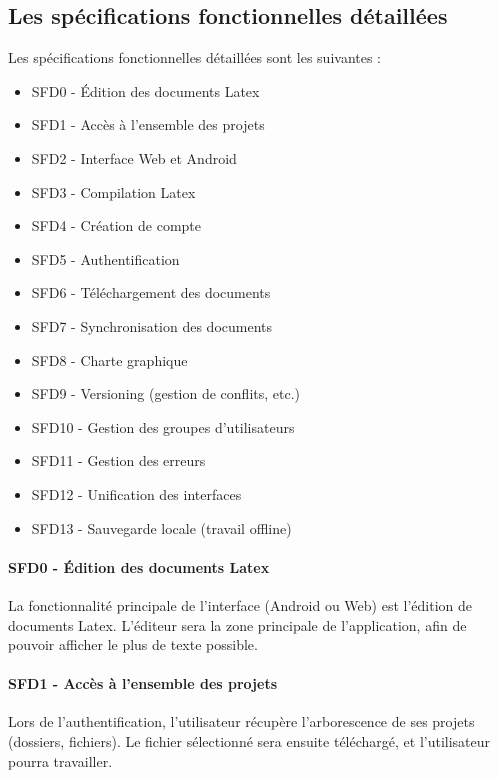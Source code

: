 \documentclass[a4paper,12pt]{article}
\begin{document}
\subsection{Les spécifications fonctionnelles détaillées}
 	
Les spécifications fonctionnelles détaillées sont les suivantes :\\

\begin{itemize}
 \item SFD0 - \'Edition des documents Latex
 \item SFD1 - Accès à l'ensemble des projets
 \item SFD2 - Interface Web et Android
 \item SFD3 - Compilation Latex
 \item SFD4 - Création de compte
 \item SFD5 - Authentification
 \item SFD6 - Téléchargement des documents
 \item SFD7 - Synchronisation des documents
 \item SFD8 - Charte graphique
 \item SFD9 - Versioning (gestion de conflits, etc.)
 \item SFD10 - Gestion des groupes d'utilisateurs
 \item SFD11 - Gestion des erreurs
 \item SFD12 - Unification des interfaces
 \item SFD13 - Sauvegarde locale (travail offline)
\end{itemize}

\paragraph{SFD0 - \'Edition des documents Latex\\}
La fonctionnalité principale de l'interface (Android ou Web) est l'édition de documents Latex. 
L'éditeur sera la zone principale de l'application, afin de pouvoir afficher le plus de texte 
possible.

\paragraph{SFD1 - Accès à l'ensemble des projets\\}
Lors de l'authentification, l'utilisateur récupère l'arborescence de ses projets (dossiers, 
fichiers). Le fichier sélectionné sera ensuite téléchargé, et l'utilisateur pourra travailler.
\end{document}
